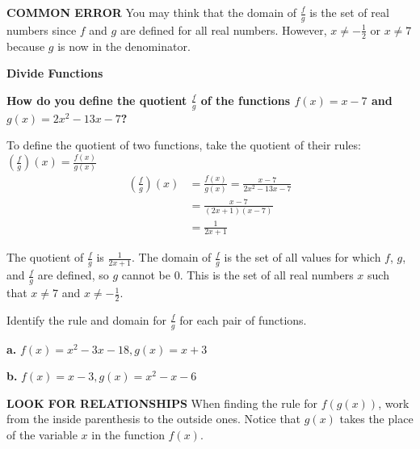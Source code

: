 \documentclass{article}
\newenvironment{example}[1]{}{}
\newenvironment{tryit}[1]{}{}
\begin{document}
\textbf{COMMON ERROR}
You may think that the domain of $\frac{f}{g}$ is the set of real numbers since $f$ and $g$ are defined for all real numbers. However, $x \neq -\frac{1}{2}$ or $x \neq 7$ because $g$ is now in the denominator.

\begin{example}{3}
\textbf{Divide Functions}

\textbf{How do you define the quotient $\frac{f}{g}$ of the functions $f(x) = x - 7$ and $g(x) = 2x^2 - 13x - 7$?}

To define the quotient of two functions, take the quotient of their rules: $\left(\frac{f}{g}\right)(x) = \frac{f(x)}{g(x)}$
\begin{align*}
\left(\frac{f}{g}\right)(x) &= \frac{f(x)}{g(x)} = \frac{x - 7}{2x^2 - 13x - 7} \\
&= \frac{x - 7}{(2x + 1)(x - 7)} \\
&= \frac{1}{2x + 1}
\end{align*}

The quotient of $\frac{f}{g}$ is $\frac{1}{2x + 1}$. The domain of $\frac{f}{g}$ is the set of all values for which $f$, $g$, and $\frac{f}{g}$ are defined, so $g$ cannot be 0. This is the set of all real numbers $x$ such that $x \neq 7$ and $x \neq -\frac{1}{2}$.
\end{example}

\begin{tryit}{3}
Identify the rule and domain for $\frac{f}{g}$ for each pair of functions.

\textbf{a.} $f(x) = x^2 - 3x - 18, g(x) = x + 3$

\textbf{b.} $f(x) = x - 3, g(x) = x^2 - x - 6$
\end{tryit}

\textbf{LOOK FOR RELATIONSHIPS}
When finding the rule for $f(g(x))$, work from the inside parenthesis to the outside ones. Notice that $g(x)$ takes the place of the variable $x$ in the function $f(x)$.
\end{document}
